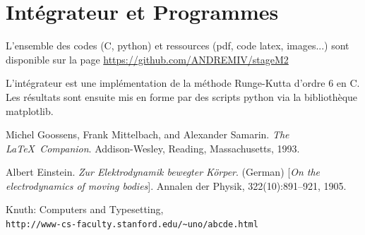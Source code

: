 \documentclass[10pt, a4paper]{report}
\numberwithin{equation}{subsection}
\begin{document}
\chapter{Intégrateur et Programmes}
L'ensemble des codes (C, python) et ressources (pdf, code latex, images...) sont disponible sur la page \url{https://github.com/ANDREMIV/stageM2}

L'intégrateur est une implémentation de la méthode Runge-Kutta d'ordre 6 en C. Les résultats sont ensuite mis en forme par des scripts python via la bibliothèque matplotlib. 


\begin{thebibliography}{9}
Michel Goossens, Frank Mittelbach, and Alexander Samarin. 
\textit{The \LaTeX\ Companion}. 
Addison-Wesley, Reading, Massachusetts, 1993.

Albert Einstein. 
\textit{Zur Elektrodynamik bewegter K{\"o}rper}. (German) 
[\textit{On the electrodynamics of moving bodies}]. 
Annalen der Physik, 322(10):891–921, 1905.

Knuth: Computers and Typesetting,
\\\texttt{http://www-cs-faculty.stanford.edu/\~{}uno/abcde.html}
\end{thebibliography}
\end{document}

